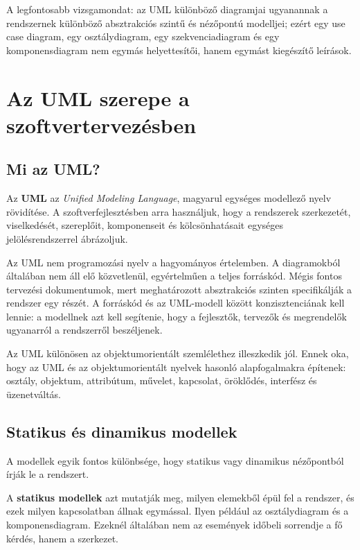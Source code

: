 A legfontosabb vizsgamondat: az UML különböző diagramjai ugyanannak a rendszernek különböző absztrakciós szintű és nézőpontú modelljei; ezért egy use case diagram, egy osztálydiagram, egy szekvenciadiagram és egy komponensdiagram nem egymás helyettesítői, hanem egymást kiegészítő leírások.

\section{Az UML szerepe a szoftvertervezésben}

\subsection{Mi az UML?}

Az \textbf{UML} az \textit{Unified Modeling Language}, magyarul egységes modellező nyelv rövidítése. A szoftverfejlesztésben arra használjuk, hogy a rendszerek szerkezetét, viselkedését, szereplőit, komponenseit és kölcsönhatásait egységes jelölésrendszerrel ábrázoljuk.

Az UML nem programozási nyelv a hagyományos értelemben. A diagramokból általában nem áll elő közvetlenül, egyértelműen a teljes forráskód. Mégis fontos tervezési dokumentumok, mert meghatározott absztrakciós szinten specifikálják a rendszer egy részét. A forráskód és az UML-modell között konzisztenciának kell lennie: a modellnek azt kell segítenie, hogy a fejlesztők, tervezők és megrendelők ugyanarról a rendszerről beszéljenek.

Az UML különösen az objektumorientált szemlélethez illeszkedik jól. Ennek oka, hogy az UML és az objektumorientált nyelvek hasonló alapfogalmakra építenek: osztály, objektum, attribútum, művelet, kapcsolat, öröklődés, interfész és üzenetváltás.

\subsection{Statikus és dinamikus modellek}

A modellek egyik fontos különbsége, hogy statikus vagy dinamikus nézőpontból írják le a rendszert.

\begin{center}

\end{center}

A \textbf{statikus modellek} azt mutatják meg, milyen elemekből épül fel a rendszer, és ezek milyen kapcsolatban állnak egymással. Ilyen például az osztálydiagram és a komponensdiagram. Ezeknél általában nem az események időbeli sorrendje a fő kérdés, hanem a szerkezet.

